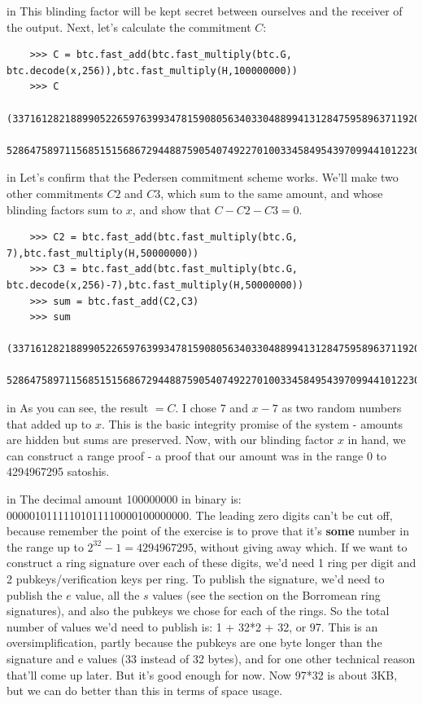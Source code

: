 \documentclass[10pt,a4paper]{article}
\begin{document}
 in \noindent This blinding factor will be kept secret between ourselves and the receiver of the output. Next, let's calculate the commitment $C$:
\begin{verbatim}
	>>> C = btc.fast_add(btc.fast_multiply(btc.G, btc.decode(x,256)),btc.fast_multiply(H,100000000))
	>>> C
	(33716128218899052265976399347815908056340330488994131284759589637119207433518L,
     52864758971156851515686729448875905407492270100334584954397099441012230985012L)
\end{verbatim}

 in \noindent Let's confirm that the Pedersen commitment scheme works. We'll make two other commitments $C2$ and $C3$, which sum to the same amount, and whose blinding factors sum to $x$, and show that $C - C2 - C3 = 0$.
\begin{verbatim}
	>>> C2 = btc.fast_add(btc.fast_multiply(btc.G, 7),btc.fast_multiply(H,50000000))
	>>> C3 = btc.fast_add(btc.fast_multiply(btc.G, btc.decode(x,256)-7),btc.fast_multiply(H,50000000))
	>>> sum = btc.fast_add(C2,C3)
	>>> sum
	(33716128218899052265976399347815908056340330488994131284759589637119207433518L,
    52864758971156851515686729448875905407492270100334584954397099441012230985012L)
\end{verbatim}

 in \noindent As you can see, the result $= C$. I chose 7 and $x-7$ as two random numbers that added up to $x$. This is the basic integrity promise of the system - amounts are hidden but sums are preserved. Now, with our blinding factor $x$ in hand, we can construct a range proof - a proof that our amount was in the range 0 to 4294967295 satoshis.

 in \noindent The decimal amount 100000000 in binary is: 00000101111101011110000100000000. The leading zero digits can't be cut off, because remember the point of the exercise is to prove that it's \textbf{some} number in the range up to $2^{32} -1 = 4294967295$, without giving away which. If we want to construct a ring signature over each of these digits, we'd need 1 ring per digit and 2 pubkeys/verification keys per ring. To publish the signature, we'd need to publish the $e$ value, all the $s$ values (see the section on the Borromean ring signatures), and also the pubkeys we chose for each of the rings. So the total number of values we'd need to publish is: 1 + 32*2 + 32, or 97. This is an oversimplification, partly because the pubkeys are one byte longer than the signature and e values (33 instead of 32 bytes), and for one other technical reason that'll come up later. But it's good enough for now. Now 97*32 is about 3KB, but we can do better than this in terms of space usage.
\end{document}
